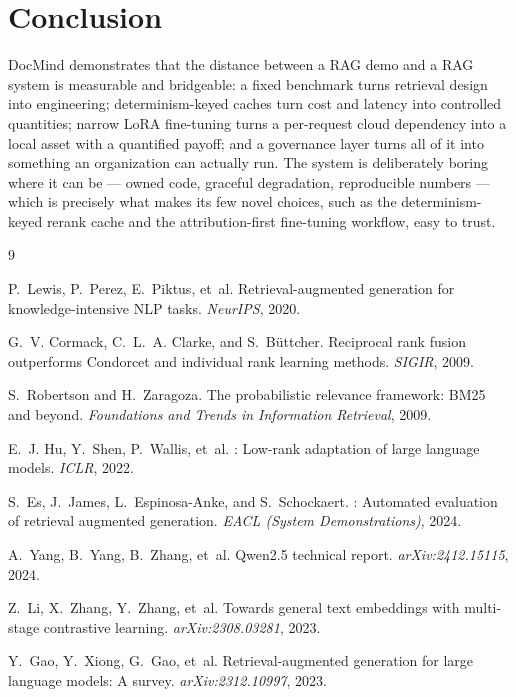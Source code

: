 \documentclass[11pt,a4paper]{article}
\begin{document}
\section{Conclusion}\label{sec:conclusion}

DocMind demonstrates that the distance between a RAG demo and a RAG system is
measurable and bridgeable: a fixed benchmark turns retrieval design into engineering;
determinism-keyed caches turn cost and latency into controlled quantities; narrow LoRA
fine-tuning turns a per-request cloud dependency into a local asset with a quantified
payoff; and a governance layer turns all of it into something an organization can
actually run. The system is deliberately boring where it can be --- owned code, graceful
degradation, reproducible numbers --- which is precisely what makes its few novel
choices, such as the determinism-keyed rerank cache and the attribution-first
fine-tuning workflow, easy to trust.


\begin{thebibliography}{9}

P.~Lewis, P.~Perez, E.~Piktus, et~al.
\newblock Retrieval-augmented generation for knowledge-intensive {NLP} tasks.
\newblock \emph{NeurIPS}, 2020.

G.~V. Cormack, C.~L.~A. Clarke, and S.~B\"uttcher.
\newblock Reciprocal rank fusion outperforms {Condorcet} and individual rank learning
  methods.
\newblock \emph{SIGIR}, 2009.

S.~Robertson and H.~Zaragoza.
\newblock The probabilistic relevance framework: {BM25} and beyond.
\newblock \emph{Foundations and Trends in Information Retrieval}, 2009.

E.~J. Hu, Y.~Shen, P.~Wallis, et~al.
: Low-rank adaptation of large language models.
\newblock \emph{ICLR}, 2022.

S.~Es, J.~James, L.~Espinosa-Anke, and S.~Schockaert.
: Automated evaluation of retrieval augmented generation.
\newblock \emph{EACL (System Demonstrations)}, 2024.

A.~Yang, B.~Yang, B.~Zhang, et~al.
\newblock Qwen2.5 technical report.
\newblock \emph{arXiv:2412.15115}, 2024.

Z.~Li, X.~Zhang, Y.~Zhang, et~al.
\newblock Towards general text embeddings with multi-stage contrastive learning.
\newblock \emph{arXiv:2308.03281}, 2023.

Y.~Gao, Y.~Xiong, G.~Gao, et~al.
\newblock Retrieval-augmented generation for large language models: A survey.
\newblock \emph{arXiv:2312.10997}, 2023.

\end{thebibliography}
\end{document}
